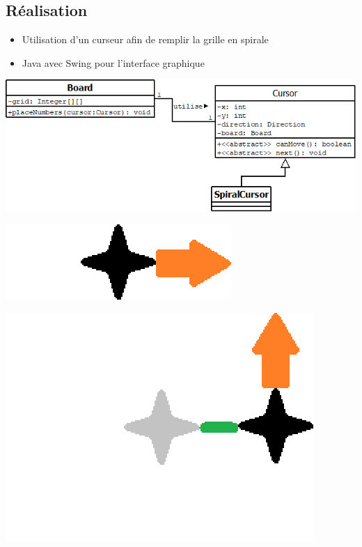 \documentclass{beamer}
\begin{document}
\subsection{Réalisation}
\begin{frame}
\begin{itemize}
\item Utilisation d'un curseur afin de remplir la grille en spirale
\item Java avec Swing pour l'interface graphique
\end{itemize}
\vspace{0.5cm}
\begin{center}
\includegraphics[scale=0.45]{images/dia_spirale.png}
\end{center}
\end{frame}

\begin{frame}
\begin{center}
\vspace{0.5cm}
\includegraphics[scale=0.5]{images/s1.PNG}
\end{center}
\end{frame}

\begin{frame}
\begin{center}
\includegraphics[scale=0.5]{images/s2.PNG}
\end{center}
\end{frame}
\end{document}

